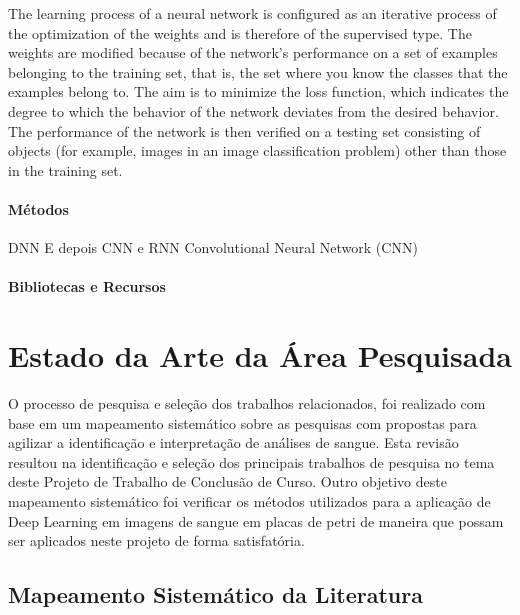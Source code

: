 
The learning process of a neural network is configured as an iterative process of the 
optimization of the weights and is therefore of the supervised type. The weights are 
modified because of the network's performance on a set of examples belonging to the 
training set, that is, the set where you know the classes that the examples belong to. 
The aim is to minimize the loss function, which indicates the degree to which the 
behavior of the network deviates from the desired behavior. The performance of the 
network is then verified on a testing set consisting of objects (for example, images in 
an image classification problem) other than those in the training set.

\subsubsection{Métodos}
DNN E depois CNN e RNN
Convolutional Neural Network (CNN)

\subsubsection{Bibliotecas e Recursos}


\chapter{Estado da Arte da Área Pesquisada}
\label{chap:mapeamento}

O processo de pesquisa e seleção dos trabalhos relacionados, foi realizado com base em um mapeamento sistemático sobre as pesquisas com propostas para agilizar a identificação e interpretação de análises de sangue. Esta revisão resultou na identificação e seleção dos principais trabalhos de pesquisa no tema deste Projeto de Trabalho de Conclusão de Curso. Outro objetivo deste mapeamento sistemático foi verificar os métodos utilizados para a aplicação de Deep Learning em imagens de sangue em placas de petri de maneira que possam ser aplicados neste projeto de forma satisfatória.

\section{Mapeamento Sistemático da Literatura}

